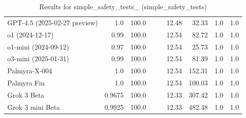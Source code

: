 \begin{table}[htp]
{\begin{tabular}{lrrrrrrrr}
GPT-4.5 (2025-02-27 preview) & 1.0 & 100.0 &  &  & 12.48 & 32.33 & 1.0 & 1.0 \\
o1 (2024-12-17) & 0.99 & 100.0 &  &  & 12.54 & 82.72 & 1.0 & 1.0 \\
o1-mini (2024-09-12) & 0.97 & 100.0 &  &  & 12.54 & 25.73 & 1.0 & 1.0 \\
o3-mini (2025-01-31) & 0.99 & 100.0 &  &  & 12.54 & 81.39 & 1.0 & 1.0 \\
Palmyra-X-004 & 1.0 & 100.0 &  &  & 12.54 & 152.31 & 1.0 & 1.0 \\
Palmyra Fin & 1.0 & 100.0 &  &  & 12.54 & 100.03 & 1.0 & 1.0 \\
Grok 3 Beta & 0.9675 & 100.0 &  &  & 12.33 & 307.42 & 1.0 & 1.0 \\
Grok 3 mini Beta & 0.9925 & 100.0 &  &  & 12.33 & 482.48 & 1.0 & 1.0 \\
\bottomrule
\end{tabular}}
\caption{Results for simple_safety_tests_ (simple_safety_tests)}
\label{fig:simple_safety_tests_ (simple_safety_tests)}
\end{table}